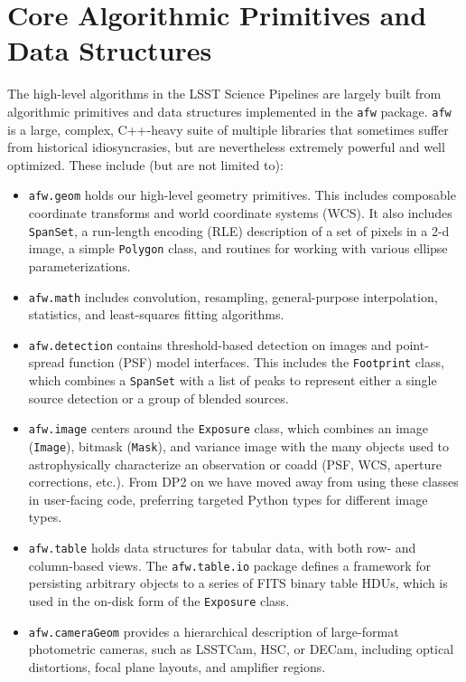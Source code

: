 \section{Core Algorithmic Primitives and Data Structures}
\label{sec:core}

The high-level algorithms in the LSST Science Pipelines are largely built from algorithmic primitives and data structures implemented in the \texttt{afw} package.
\texttt{afw} is a large, complex, C++-heavy suite of multiple libraries that sometimes suffer from historical idiosyncrasies, but are nevertheless extremely powerful and well optimized.
These include (but are not limited to):
\begin{itemize}
\item \texttt{afw.geom} holds our high-level geometry primitives.  This includes composable coordinate transforms and world coordinate systems (WCS).
    It also includes \texttt{SpanSet}, a run-length encoding (RLE) description of a set of pixels in a 2-d image, a simple \texttt{Polygon} class, and routines for working with various ellipse parameterizations.
\item \texttt{afw.math} includes convolution, resampling, general-purpose interpolation, statistics, and least-squares fitting algorithms.
\item \texttt{afw.detection} contains threshold-based detection on images and point-spread function (PSF) model interfaces.
    This includes the \texttt{Footprint} class, which combines a \texttt{SpanSet} with a list of peaks to represent either a single source detection or a group of blended sources.
\item \texttt{afw.image} centers around the \texttt{Exposure} class, which combines an image (\texttt{Image}), bitmask (\texttt{Mask}), and variance image with the many objects used to astrophysically characterize an observation or coadd (PSF, WCS, aperture corrections, etc.).
      From DP2 on we have moved away from using these classes in user-facing code, preferring targeted Python types for different image types.
\item \texttt{afw.table} holds data structures for tabular data, with both row- and column-based views.  The \texttt{afw.table.io} package defines a framework for persisting arbitrary objects to a series of FITS binary table HDUs, which is used in the on-disk form of the \texttt{Exposure} class.
\item \texttt{afw.cameraGeom} provides a hierarchical description of large-format photometric cameras, such as LSSTCam, HSC, or DECam, including optical distortions, focal plane layouts, and amplifier regions.
\end{itemize}
